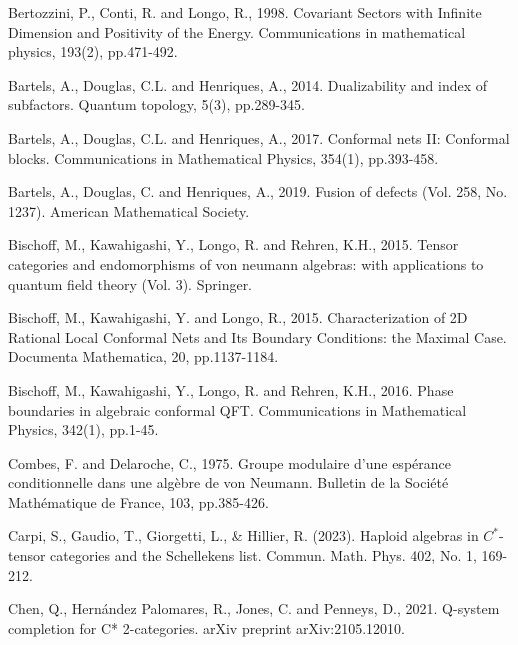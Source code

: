 \documentclass[11pt,b5paper,notitlepage]{article}
\theoremstyle{definition}
\theoremstyle{plain}
\numberwithin{equation}{section}
\begin{document}
	\begin{thebibliography}{999999}
		\footnotesize	
		
		
		
		

Bertozzini, P., Conti, R. and Longo, R., 1998. Covariant Sectors with Infinite Dimension and Positivity of the Energy. Communications in mathematical physics, 193(2), pp.471-492.

Bartels, A., Douglas, C.L. and Henriques, A., 2014. Dualizability and index of subfactors. Quantum topology, 5(3), pp.289-345.

Bartels, A., Douglas, C.L. and Henriques, A., 2017. Conformal nets II: Conformal blocks. Communications in Mathematical Physics, 354(1), pp.393-458.

Bartels, A., Douglas, C. and Henriques, A., 2019. Fusion of defects (Vol. 258, No. 1237). American Mathematical Society.

Bischoff, M., Kawahigashi, Y., Longo, R. and Rehren, K.H., 2015. Tensor categories and endomorphisms of von neumann algebras: with applications to quantum field theory (Vol. 3). Springer.

Bischoff, M., Kawahigashi, Y. and Longo, R., 2015. Characterization of 2D Rational Local Conformal Nets and Its Boundary Conditions: the Maximal Case. Documenta Mathematica, 20, pp.1137-1184.

Bischoff, M., Kawahigashi, Y., Longo, R. and Rehren, K.H., 2016. Phase boundaries in algebraic conformal QFT. Communications in Mathematical Physics, 342(1), pp.1-45.



Combes, F. and Delaroche, C., 1975. Groupe modulaire d'une espérance conditionnelle dans une algèbre de von Neumann. Bulletin de la Société Mathématique de France, 103, pp.385-426.

Carpi, S., Gaudio, T., Giorgetti, L., \& Hillier, R. (2023). Haploid algebras in $C^*$-tensor categories and the Schellekens list. Commun. Math. Phys. 402, No. 1, 169-212.

Chen, Q., Hernández Palomares, R., Jones, C. and Penneys, D., 2021. Q-system completion for C* 2-categories. arXiv preprint arXiv:2105.12010.


\end{thebibliography}
\end{document}
